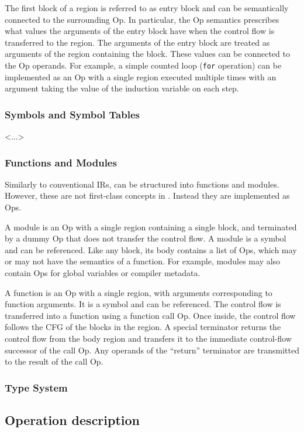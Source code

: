 The first block of a region is referred to as entry block and can be
semantically connected to the surrounding Op. In particular, the Op semantics
prescribes what values the arguments of the entry block have when the control
flow is transferred to the region. The arguments of the entry block are treated
as arguments of the region containing the block. These values can be connected
to the Op operands. For example, a simple counted loop (\lstinline!for! operation) can be
implemented as an Op with a single region executed multiple times with an
argument taking the value of the induction variable on each step.

\subsubsection{Symbols and Symbol Tables}
<...>

\subsubsection{Functions and Modules}
Similarly to conventional IRs, \MLIR can be structured into functions and
modules. However, these are not first-class concepts in \MLIR. Instead they are
implemented as Ops.

A module is an Op with a single region containing a single block, and
terminated by a dummy Op that does not transfer the control flow. A module is a
symbol and can be referenced. Like any block, its body contains a list of Ops,
which may or may not have the semantics of a function. For example, modules may
also contain Ops for global variables or compiler metadata.

A function is an Op with a single region, with arguments corresponding to
function arguments. It is a symbol and can be referenced. The control flow is
transferred into a function using a function call Op. Once inside, the control
flow follows the CFG of the blocks in the region. A special terminator returns
the control flow from the body region and transfers it to the immediate
control-flow successor of the call Op. Any operands of the ``return'' terminator
are transmitted to the result of the call Op.

\subsubsection{Type System}

\subsection{Operation description}

